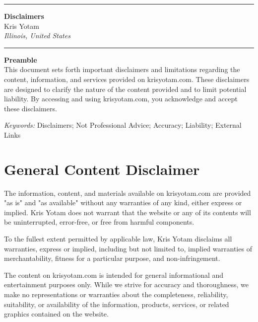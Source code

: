 \documentclass[11pt]{article}
\newcommand{\TitleLine}{\noindent\rule{\textwidth}{0.4pt}}
\begin{document}
\onehalfspacing

\vspace*{-1em}
\TitleLine
\vspace{0.5em}
\begin{center}
  {\Large\bfseries Disclaimers}\\[0.75em]
  {\normalsize Kris Yotam}\\
  {\itshape Illinois, United States}
\end{center}
\vspace{0.5em}
\TitleLine

\vspace{1.5em}

\noindent\textbf{Preamble}\\
This document sets forth important disclaimers and limitations regarding the content, information, and services provided on krisyotam.com. These disclaimers are designed to clarify the nature of the content provided and to limit potential liability. By accessing and using krisyotam.com, you acknowledge and accept these disclaimers.

\vspace{0.75em}
\noindent\textit{Keywords:} Disclaimers; Not Professional Advice; Accuracy; Liability; External Links

\vspace{1.5em}

\section{General Content Disclaimer}
The information, content, and materials available on krisyotam.com are provided "as is" and "as available" without any warranties of any kind, either express or implied. Kris Yotam does not warrant that the website or any of its contents will be uninterrupted, error-free, or free from harmful components.

To the fullest extent permitted by applicable law, Kris Yotam disclaims all warranties, express or implied, including but not limited to, implied warranties of merchantability, fitness for a particular purpose, and non-infringement.

The content on krisyotam.com is intended for general informational and entertainment purposes only. While we strive for accuracy and thoroughness, we make no representations or warranties about the completeness, reliability, suitability, or availability of the information, products, services, or related graphics contained on the website.
\end{document}
